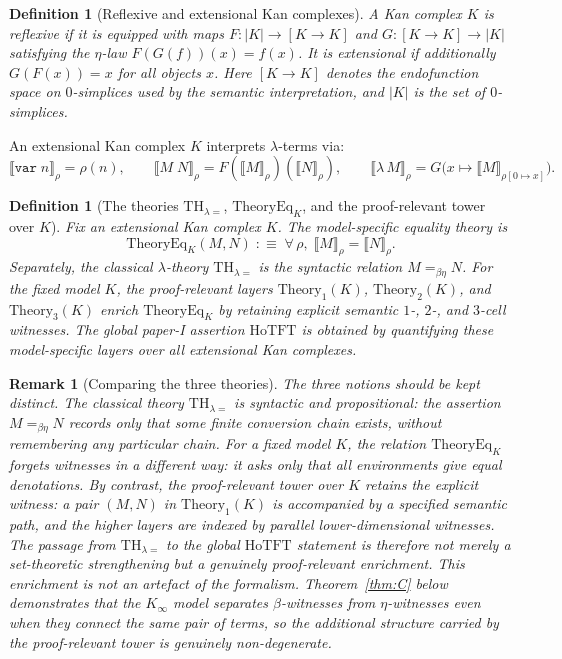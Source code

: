 \documentclass[webpdf,traditional,large,numbered]{oup-authoring-template}
\theoremstyle{thmstyleone}%
\theoremstyle{thmstyletwo}%
\newtheorem{remark}[theorem]{Remark}
\theoremstyle{thmstylethree}%
\newtheorem{definition}[theorem]{Definition}
\newcommand{\Kinf}{K_\infty}
\newcommand{\THeq}{\mathrm{TH}_{\lambda =}}
\newcommand{\HoTFT}{\mathrm{HoTFT}}
\begin{document}
\begin{definition}[Reflexive and extensional Kan complexes]
  A Kan complex $K$ is \emph{reflexive} if it is equipped with maps $F: |K|
  \to [K \to K]$ and $G: [K \to K] \to |K|$ satisfying the $\eta$-law
  $F(G(f))(x) = f(x)$. It is \emph{extensional} if additionally $G(F(x)) = x$
  for all objects $x$. Here $[K \to K]$ denotes the endofunction space on
  $0$-simplices used by the semantic interpretation, and $|K|$ is the set of
  $0$-simplices.
\end{definition}

An extensional Kan complex $K$ interprets $\lambda$-terms via:
\[
  \llbracket\mathtt{var}\;n\rrbracket_\rho = \rho(n),\qquad
  \llbracket M\;N \rrbracket_\rho = F(\llbracket M\rrbracket_\rho)
    (\llbracket N\rrbracket_\rho),\qquad
  \llbracket \lambda\,M \rrbracket_\rho =
    G\bigl(x \mapsto \llbracket M \rrbracket_{\rho[0 \mapsto x]}\bigr).
\]

\begin{definition}[The theories $\THeq$, $\mathrm{TheoryEq}_K$, and the proof-relevant tower over $K$]\label{def:theories}
  Fix an extensional Kan complex $K$.  The \emph{model-specific equality
  theory} is
  \[
    \mathrm{TheoryEq}_K(M,N)
    \;:\equiv\;
    \forall\,\rho,\;\llbracket M\rrbracket_\rho = \llbracket N\rrbracket_\rho.
  \]
  Separately, the \emph{classical $\lambda$-theory} $\THeq$ is the syntactic
  relation $M =_{\beta\eta} N$.  For the fixed model $K$, the proof-relevant
  layers $\mathrm{Theory}_1(K)$, $\mathrm{Theory}_2(K)$, and
  $\mathrm{Theory}_3(K)$ enrich $\mathrm{TheoryEq}_K$ by retaining explicit
  semantic $1$-, $2$-, and $3$-cell witnesses.  The global paper-I assertion
  $\HoTFT$ is obtained by quantifying these model-specific layers over all
  extensional Kan complexes.
\end{definition}

\begin{remark}[Comparing the three theories]
The three notions should be kept distinct.  The classical theory $\THeq$ is
syntactic and propositional: the assertion $M =_{\beta\eta} N$ records only
that some finite conversion chain exists, without remembering any particular
chain.  For a fixed model $K$, the relation $\mathrm{TheoryEq}_K$ forgets
  witnesses in a different way: it asks only that all environments give equal
  denotations.  By contrast, the proof-relevant tower over $K$ retains the
  \emph{explicit witness}: a pair $(M,N)$ in $\mathrm{Theory}_1(K)$ is
  accompanied by a specified semantic path, and the higher layers are indexed by
  parallel lower-dimensional witnesses.  The passage from $\THeq$ to the global
  $\HoTFT$ statement is therefore not merely a set-theoretic strengthening but a
  genuinely proof-relevant enrichment.  This enrichment is not an artefact of
  the formalism.  Theorem~\ref{thm:C} below demonstrates that the $\Kinf$ model
  separates $\beta$-witnesses from $\eta$-witnesses even when they connect the
  same pair of terms, so the additional structure carried by the proof-relevant
  tower is genuinely non-degenerate.
\end{remark}
\end{document}
